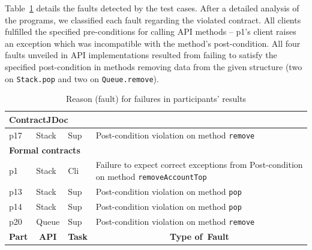 Table~\ref{tab:faults} details the faults detected by the test cases. After a detailed analysis of the programs, we classified each fault regarding the violated contract. 
All clients fulfilled the specified pre-conditions for calling API methods -- p1's client raises an exception which was incompatible with the method's post-condition.
All four faults unveiled in API implementations resulted from failing to satisfy the specified post-condition in methods removing data from the given structure (two on \texttt{Stack.pop} and two on \texttt{Queue.remove}).

\begin{table}
\centering
\caption{Reason (fault) for failures in participants' results}
\label{tab:faults}
\begin{adjustbox}{width=\textwidth}
\begin{tabular}{|l|l|l|l|} 
\hline
\multicolumn{4}{|l|}{\textbf{ContractJDoc }}                                                                                                                                                                    \\ 
\hline
p17                                        & Stack                             & Sup                                & Post-condition violation on method \texttt{remove}                                    \\ 
\hline
\multicolumn{4}{|l|}{\textbf{Formal contracts} }                                                                                                                                                                \\ 
\hline
p1                                         & Stack                             & Cli                                & Failure to expect correct exceptions from Post-condition on method \texttt{removeAccountTop}    \\ 
\hline
p13                                        & Stack                             & Sup                                & Post-condition violation on method \texttt{pop}     \\ 
\hline
p14                                        & Stack                             & Sup                                & Post-condition violation on method \texttt{pop}     \\ 
\hline
p20                                        & Queue                             & Sup                                & Post-condition violation on method \texttt{remove}  \\ 
\hline\hline
\multicolumn{1}{|c|}{\textbf{Part}} & \multicolumn{1}{c|}{\textbf{API}} & \multicolumn{1}{c|}{\textbf{Task}} & \multicolumn{1}{c|}{\textbf{Type of~Fault}}                                               \\
\hline
\end{tabular}
\end{adjustbox}
\end{table}

